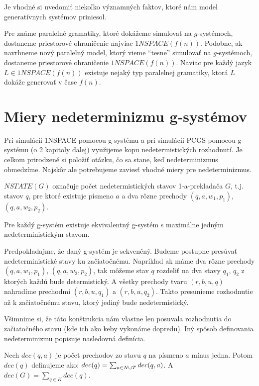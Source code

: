 Je vhodné si uvedomiť niekoľko významných faktov, ktoré nám model
generatívnych systémov priniesol.

Pre známe paralelné gramatiky, ktoré dokážeme simulovať na
$g$-systémoch, dostaneme priestorové ohraničenie najviac
$1NSPACE(f(n))$. Podobne, ak navrhneme nový paralelný model, ktorý
vieme ``tesne'' simulovať na $g$-systémoch, dostaneme priestorové
ohraničenie $1NSPACE(f(n))$. Naviac pre každý jazyk $L\in
1NSPACE(f(n))$ existuje nejaký typ paralelnej gramatiky, ktorá $L$
dokáže generovať v čase $f(n)$.

\section{Miery nedeterminizmu g-systémov}

Pri simulácii 1NSPACE pomocou g-systému a pri simulácii PCGS pomocou g-systému (o 2 kapitoly ďalej)
využijeme kopu nedetermistických rozhodnutí. Je celkom prirodzené si položiť otázku, čo sa stane,
keď nedeterminizmus obmedzíme. Najskôr ale potrebujeme zaviesť vhodné miery pre nedeterminizmus.

\begin{definicia}
$NSTATE(G)$ označuje počet nedetermistických stavov 1-a-prekladača $G$, t.j. stavov $q$, pre ktoré
existuje písmeno $a$ a dva rôzne prechody $(q,a,w_1,p_1)$, $(q,a,w_2,p_2)$.
\end{definicia}

\begin{veta}
Pre každý g-systém existuje ekvivalentný g-systém s maximálne jedným nedeterministickým stavom.
\end{veta}

\begin{dokaz}
Predpokladajme, že daný g-systém je sekvenčný. 
Budeme postupne presúvať nedeterministické stavy ku začiatočnému.
Napríklad ak máme dva rôzne prechody $(q,a,w_1,p_1)$, $(q,a,w_2,p_2)$, tak môžeme stav
$q$ rozdeliť na dva stavy $q_1$, $q_2$ z ktorých každú bude determistický. A všetky prechody tvaru
$(r,b,u,q)$ nahradíme prechodmi $(r,b,u,q_1)$ a $(r,b,u,q_2)$.
Takto presunieme rozhodnutie až k začiatočnému stavu, ktorý jediný bude nedetermistický.
\end{dokaz}

Všimnime si, že táto konštrukcia nám vlastne len posuvala rozhodnutia do začiatočného stavu (kde ich
ako keby vykonáme dopredu). Iný spôsob definovania nedeterminizmu popisuje nasledovná definícia.

\begin{definicia}
Nech $dec(q,a)$ je počet prechodov zo stavu $q$ na písmeno $a$ mínus jedna.
Potom $dec(q)$ definujeme ako: $dec(q) = \sum_{a \in N \cup T} dec(q,a)$.
A $dec(G) = \sum_{q \in K} dec(q)$.
\end{definicia}

